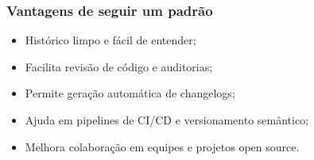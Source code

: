 \subsubsection*{Vantagens de seguir um padrão}
\begin{itemize}
  \item Histórico limpo e fácil de entender;
  \item Facilita revisão de código e auditorias;
  \item Permite geração automática de changelogs;
  \item Ajuda em pipelines de CI/CD e versionamento semântico;
  \item Melhora colaboração em equipes e projetos open source.
\end{itemize}